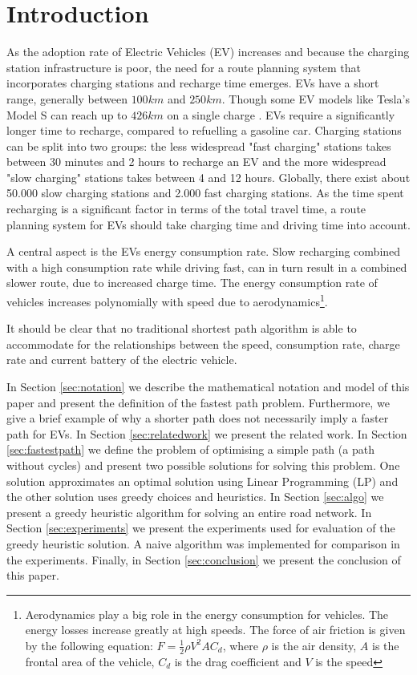 \section{Introduction}

As the adoption rate of Electric Vehicles (EV) increases \cite{Henry2013} and because the charging station infrastructure is poor, the need for a route planning system that incorporates charging stations and recharge time emerges. EVs have a short range, generally between $100\si{km}$ and $250\si{km}$. Though some EV models like Tesla's Model S can reach up to $426\si{km}$ on a single charge \cite{teslacon}. EVs require a significantly longer time to recharge, compared to refuelling a gasoline car. Charging stations can be split into two groups: the less widespread "fast charging" stations takes between 30 minutes and 2 hours to recharge an EV and the more widespread "slow charging" stations takes between 4 and 12 hours. Globally, there exist about 50.000 slow charging stations and 2.000 fast charging stations\cite{Globalevoutlook}. As the time spent recharging is a significant factor in terms of the total travel time, a route planning system for EVs should take charging time and driving time into account.

A central aspect is the EVs energy consumption rate. Slow recharging combined with a high consumption rate while driving fast, can in turn result in a combined slower route, due to increased charge time. The energy consumption rate of vehicles increases polynomially with speed due to aerodynamics\footnote{Aerodynamics play a big role in the energy consumption for vehicles. The energy losses increase greatly at high speeds. The force of air friction is given by the following equation: $F = \frac{1}{2} \rho V^2 A C_d$, where $\rho$ is the air density, $A$ is the frontal area of the vehicle, $C_d$ is the drag coefficient and $V$ is the speed}.

It should be clear that no traditional shortest path algorithm is able to accommodate for the relationships between the speed, consumption rate, charge rate and current battery of the electric vehicle. 

In Section \ref{sec:notation} we describe the mathematical notation and model of this paper and present the definition of the fastest path problem. Furthermore, we give a brief example of why a shorter path does not necessarily imply a faster path for EVs. In Section \ref{sec:relatedwork} we present the related work. In Section \ref{sec:fastestpath} we define the problem of optimising a simple path (a path without cycles) and present two possible solutions for solving this problem. One solution approximates an optimal solution using Linear Programming (LP) and the other solution uses greedy choices and heuristics. In Section \ref{sec:algo} we present a greedy heuristic algorithm for solving an entire road network. In Section \ref{sec:experiments} we present the experiments used for evaluation of the greedy heuristic solution. A naive algorithm was implemented for comparison in the experiments. Finally, in Section \ref{sec:conclusion} we present the conclusion of this paper.    

